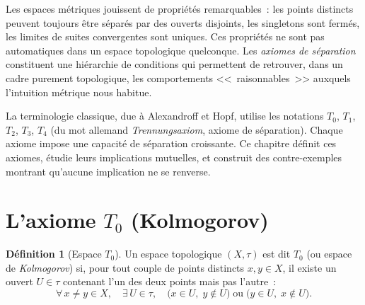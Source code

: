 \documentclass[12pt,a4paper,openany]{book}
\theoremstyle{definition}
\newtheorem{definition}{Définition}[chapter]
\theoremstyle{cours}
\theoremstyle{coursnormal}
\begin{document}
Les espaces métriques jouissent de propriétés
remarquables~: les points distincts peuvent toujours être séparés par des
ouverts disjoints, les singletons sont fermés, les limites de suites
convergentes sont uniques. Ces propriétés ne sont pas automatiques dans un
espace topologique quelconque. Les \emph{axiomes de séparation} constituent une hiérarchie de conditions qui permettent de
retrouver, dans un cadre purement topologique, les comportements
<<~raisonnables~>> auxquels l'intuition métrique nous habitue.

\medskip

La terminologie classique, due à Alexandroff et Hopf, utilise les notations
$T_0$, $T_1$, $T_2$, $T_3$, $T_4$ (du mot allemand \emph{Trennungsaxiom},
axiome de séparation). Chaque axiome impose une capacité de séparation
croissante. Ce chapitre définit ces axiomes, étudie leurs implications
mutuelles, et construit des contre-exemples montrant qu'aucune implication
ne se renverse.

\medskip

\begin{center}
\label{fig:hierarchie-separation}
\end{center}

\section{L'axiome $T_0$ (Kolmogorov)}\label{sec:T0}

\begin{definition}[Espace $T_0$]\label{def:T0}
  Un espace topologique
  $(X,\tau)$ est dit \emph{$T_0$} (ou espace de \emph{Kolmogorov}) si, pour
  tout couple de points distincts $x,y\in X$, il existe un ouvert $U\in\tau$
  contenant l'un des deux points mais pas l'autre~:
  \[
    \forall\, x\neq y\in X,\quad
    \exists\, U\in\tau,\quad
    \bigl(x\in U,\; y\notin U\bigr)
    \;\text{ou}\;
    \bigl(y\in U,\; x\notin U\bigr).
  \]
\end{definition}
\end{document}
